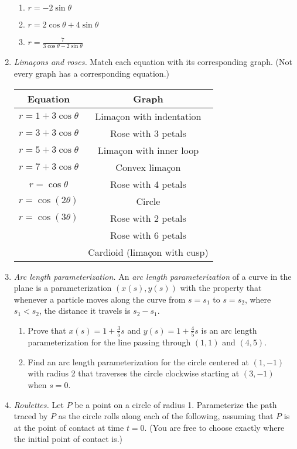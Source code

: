 \begin{enumerate}
\begin{enumerate}
\item $r = -2\sin\theta$
\item $r = 2\cos\theta + 4\sin\theta$
\item $r = \frac{7}{3\cos\theta - 2\sin\theta}$
\end{enumerate}
\item \emph{Lima\c{c}ons and roses.} Match each equation with its corresponding graph. (Not every graph has a corresponding equation.)
\begin{table}[H]
\centering 
\begingroup\setlength{\tabcolsep}{40pt}
\begin{tabular}{cc}
Equation & Graph \\ \hline
$r = 1 + 3\cos\theta$ & Lima\c{c}on with indentation \\
$r = 3 + 3\cos\theta$ & Rose with 3 petals \\
$r = 5 + 3\cos\theta$ & Lima\c{c}on with inner loop \\
$r = 7 + 3\cos\theta$ & Convex lima\c{c}on\\
$r = \cos\theta$ & Rose with 4 petals \\
$r = \cos(2\theta)$ & Circle \\
$r = \cos(3\theta)$ & Rose with 2 petals \\
{} & Rose with 6 petals \\
{} & Cardioid (lima\c{c}on with cusp)
\end{tabular}
\endgroup
\end{table}
\item \emph{Arc length parameterization.} An \emph{arc length parameterization} of a curve in the plane is a parameterization $(x(s), y(s))$ with the property that whenever a particle moves along the curve from $s = s_1$ to $s = s_2$, where $s_1 < s_2$, the distance it travels is $s_2 - s_1$.
\begin{enumerate}
\item Prove that $x(s) = 1 + \frac{3}{5}s$ and $y(s) = 1 + \frac{4}{5}s$ is an arc length parameterization for the line passing through $(1,1)$ and $(4,5)$.
\item Find an arc length parameterization for the circle centered at $(1,-1)$ with radius 2 that traverses the circle clockwise starting at $(3,-1)$ when $s = 0$.
\end{enumerate}
\item \emph{Roulettes.} Let $P$ be a point on a circle of radius 1. Parameterize the path traced by $P$ as the circle rolls along each of the following, assuming that $P$ is at the point of contact at time $t = 0$. (You are free to choose exactly where the initial point of contact is.)

\end{enumerate}
